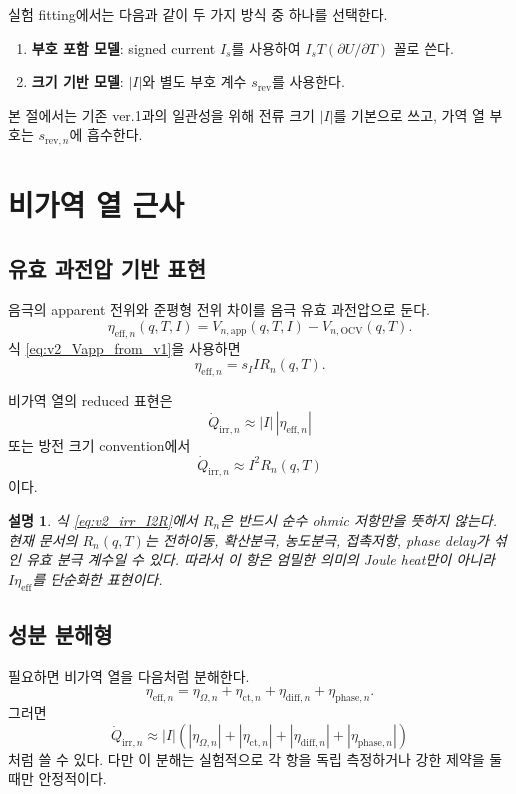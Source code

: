 \documentclass[11pt,a4paper]{article}
\newtheorem*{note}{설명}
\newcommand{\OCV}{\mathrm{OCV}}
\newcommand{\app}{\mathrm{app}}
\newcommand{\eff}{\mathrm{eff}}
\begin{document}
실험 fitting에서는 다음과 같이 두 가지 방식 중 하나를 선택한다.
\begin{enumerate}[label=\arabic*)]
\item \textbf{부호 포함 모델}: signed current \(I_s\)를 사용하여 \(I_sT(\partial U/\partial T)\) 꼴로 쓴다.
\item \textbf{크기 기반 모델}: \(|I|\)와 별도 부호 계수 \(s_{\mathrm{rev}}\)를 사용한다.
\end{enumerate}

본 절에서는 기존 ver.1과의 일관성을 위해 전류 크기 \(|I|\)를 기본으로 쓰고, 가역 열 부호는 \(s_{\mathrm{rev},n}\)에 흡수한다.

\section{비가역 열 근사}
\subsection{유효 과전압 기반 표현}
음극의 apparent 전위와 준평형 전위 차이를 음극 유효 과전압으로 둔다.
\begin{equation}
\eta_{\eff,n}(q,T,I)=V_{n,\app}(q,T,I)-V_{n,\OCV}(q,T).
\label{eq:v2_eta_eff}
\end{equation}
식 \eqref{eq:v2_Vapp_from_v1}을 사용하면
\begin{equation}
\eta_{\eff,n}=s_IIR_n(q,T).
\label{eq:v2_eta_eff_R}
\end{equation}

비가역 열의 reduced 표현은
\begin{equation}
\dot Q_{\mathrm{irr},n}\approx |I|\,|\eta_{\eff,n}|
\label{eq:v2_irr_eta_abs}
\end{equation}
또는 방전 크기 convention에서
\begin{equation}
\boxed{
\dot Q_{\mathrm{irr},n}\approx I^2R_n(q,T)
}
\label{eq:v2_irr_I2R}
\end{equation}
이다.

\begin{note}
식 \eqref{eq:v2_irr_I2R}에서 \(R_n\)은 반드시 순수 ohmic 저항만을 뜻하지 않는다. 현재 문서의 \(R_n(q,T)\)는 전하이동, 확산분극, 농도분극, 접촉저항, phase delay가 섞인 유효 분극 계수일 수 있다. 따라서 이 항은 엄밀한 의미의 Joule heat만이 아니라 \(I\eta_{\eff}\)를 단순화한 표현이다.
\end{note}

\subsection{성분 분해형}
필요하면 비가역 열을 다음처럼 분해한다.
\begin{equation}
\eta_{\eff,n}=\eta_{\Omega,n}+\eta_{\mathrm{ct},n}+\eta_{\mathrm{diff},n}+\eta_{\mathrm{phase},n}.
\label{eq:v2_eta_components}
\end{equation}
그러면
\begin{equation}
\dot Q_{\mathrm{irr},n}\approx |I|\left(|\eta_{\Omega,n}|+|\eta_{\mathrm{ct},n}|+|\eta_{\mathrm{diff},n}|+|\eta_{\mathrm{phase},n}|\right)
\label{eq:v2_irr_components_abs}
\end{equation}
처럼 쓸 수 있다. 다만 이 분해는 실험적으로 각 항을 독립 측정하거나 강한 제약을 둘 때만 안정적이다.
\end{document}
